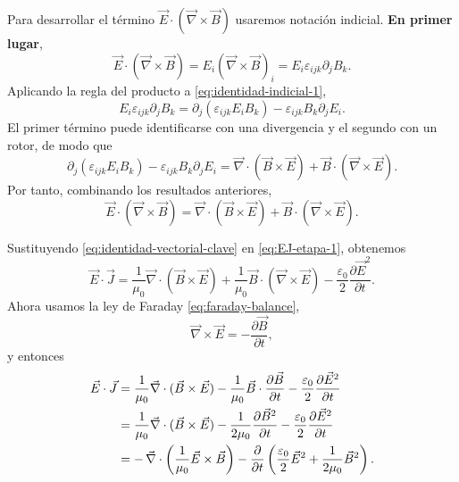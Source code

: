 \documentclass[12pt,a4paper]{article}
\theoremstyle{definition}
\theoremstyle{plain}
\numberwithin{equation}{section}
\theoremstyle{remark}
\newcommand{\E}{\vec{E}}
\newcommand{\B}{\vec{B}}
\newcommand{\J}{\vec{J}}
\begin{document}
Para desarrollar el término $\E\cdot(\vec\nabla\times\B)$ usaremos notación indicial. \textbf{En primer lugar},
\begin{equation}
    \E\cdot(\vec\nabla\times\B)=E_i(\vec\nabla\times\B)_i
    =E_i\varepsilon_{ijk}\partial_j B_k.
    \label{eq:identidad-indicial-1}
\end{equation}
Aplicando la regla del producto a \eqref{eq:identidad-indicial-1},
\begin{equation*}
    E_i\varepsilon_{ijk}\partial_j B_k
    =
    \partial_j(\varepsilon_{ijk}E_iB_k)
    -
    \varepsilon_{ijk}B_k\partial_j E_i.
\end{equation*}
El primer término puede identificarse con una divergencia y el segundo con un rotor, de modo que
\begin{equation*}
    \partial_j(\varepsilon_{ijk}E_iB_k)
    -
    \varepsilon_{ijk}B_k\partial_j E_i
    =
    \vec\nabla\cdot(\B\times\E)+\B\cdot(\vec\nabla\times\E).
\end{equation*}
Por tanto, combinando los resultados anteriores,
\begin{equation}
    \E\cdot(\vec\nabla\times\B)
    =
    \vec\nabla\cdot(\B\times\E)+\B\cdot(\vec\nabla\times\E).
    \label{eq:identidad-vectorial-clave}
\end{equation}

Sustituyendo \eqref{eq:identidad-vectorial-clave} en \eqref{eq:EJ-etapa-1}, obtenemos
\begin{equation*}
    \E\cdot\J
    =
    \frac{1}{\mu_0}\vec\nabla\cdot(\B\times\E)
    +
    \frac{1}{\mu_0}\B\cdot(\vec\nabla\times\E)
    -
    \frac{\varepsilon_0}{2}\frac{\partial \E^2}{\partial t}.
\end{equation*}
Ahora usamos la ley de Faraday \eqref{eq:faraday-balance},
\begin{equation}
    \vec\nabla\times\E=-\frac{\partial \B}{\partial t},
    \label{eq:faraday-balance}
\end{equation}
y entonces
\begin{align}
    \E\cdot\J
    &=
    \frac{1}{\mu_0}\vec\nabla\cdot(\B\times\E)
    -
    \frac{1}{\mu_0}\B\cdot\frac{\partial \B}{\partial t}
    -
    \frac{\varepsilon_0}{2}\frac{\partial \E^2}{\partial t}\notag\\
    &=
    \frac{1}{\mu_0}\vec\nabla\cdot(\B\times\E)
    -
    \frac{1}{2\mu_0}\frac{\partial \B^2}{\partial t}
    -
    \frac{\varepsilon_0}{2}\frac{\partial \E^2}{\partial t}\notag\\
    &=
    -\,\vec\nabla\cdot\left(\frac{1}{\mu_0}\E\times\B\right)
    -
    \frac{\partial}{\partial t}
    \left(
        \frac{\varepsilon_0}{2}\E^2+\frac{1}{2\mu_0}\B^2
    \right).
    \label{eq:EJ-etapa-final}
\end{align}
\end{document}
